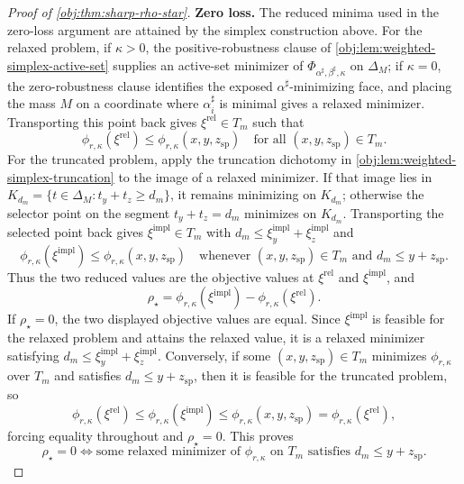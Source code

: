 \documentclass[11pt]{article}
\begin{document}
\begin{proof}[Proof of \cref{obj:thm:sharp-rho-star}]
\textbf{Zero loss.}
The reduced minima used in the zero-loss argument are attained by the simplex construction above.  For the relaxed problem, if \(\kappa>0\), the positive-robustness clause of \cref{obj:lem:weighted-simplex-active-set} supplies an active-set minimizer of \(\Phi_{\alpha^\sharp,\beta^\sharp,\kappa}\) on \(\Delta_M\); if \(\kappa=0\), the zero-robustness clause identifies the exposed \(\alpha^\sharp\)-minimizing face, and placing the mass \(M\) on a coordinate where \(\alpha^\sharp_i\) is minimal gives a relaxed minimizer.  Transporting this point back gives \(\xi^{\mathrm{rel}}\in T_m\) such that
\[
\phi_{r,\kappa}(\xi^{\mathrm{rel}})
\le\phi_{r,\kappa}(x,y,z_{\mathrm{sp}})
\quad\text{for all }(x,y,z_{\mathrm{sp}})\in T_m .
\]
For the truncated problem, apply the truncation dichotomy in \cref{obj:lem:weighted-simplex-truncation} to the image of a relaxed minimizer.  If that image lies in \(K_{d_m}=\{t\in\Delta_M:t_y+t_z\ge d_m\}\), it remains minimizing on \(K_{d_m}\); otherwise the selector point on the segment \(t_y+t_z=d_m\) minimizes on \(K_{d_m}\).  Transporting the selected point back gives \(\xi^{\mathrm{impl}}\in T_m\) with \(d_m\le \xi^{\mathrm{impl}}_y+\xi^{\mathrm{impl}}_z\) and
\[
\phi_{r,\kappa}(\xi^{\mathrm{impl}})
\le\phi_{r,\kappa}(x,y,z_{\mathrm{sp}})
\quad\text{whenever }(x,y,z_{\mathrm{sp}})\in T_m\text{ and }d_m\le y+z_{\mathrm{sp}} .
\]
Thus the two reduced values are the objective values at \(\xi^{\mathrm{rel}}\) and \(\xi^{\mathrm{impl}}\), and
\[
\rho_\star
=\phi_{r,\kappa}(\xi^{\mathrm{impl}})-\phi_{r,\kappa}(\xi^{\mathrm{rel}}).
\]
If \(\rho_\star=0\), the two displayed objective values are equal.  Since \(\xi^{\mathrm{impl}}\) is feasible for the relaxed problem and attains the relaxed value, it is a relaxed minimizer satisfying \(d_m\le \xi^{\mathrm{impl}}_y+\xi^{\mathrm{impl}}_z\).  Conversely, if some \((x,y,z_{\mathrm{sp}})\in T_m\) minimizes \(\phi_{r,\kappa}\) over \(T_m\) and satisfies \(d_m\le y+z_{\mathrm{sp}}\), then it is feasible for the truncated problem, so
\[
\phi_{r,\kappa}(\xi^{\mathrm{rel}})
\le\phi_{r,\kappa}(\xi^{\mathrm{impl}})
\le\phi_{r,\kappa}(x,y,z_{\mathrm{sp}})
=\phi_{r,\kappa}(\xi^{\mathrm{rel}}),
\]
forcing equality throughout and \(\rho_\star=0\).  This proves
\[
\rho_\star=0
\iff
\text{some relaxed minimizer of }\phi_{r,\kappa}\text{ on }T_m\text{ satisfies }d_m\le y+z_{\mathrm{sp}} .
\]


\end{proof}
\end{document}
